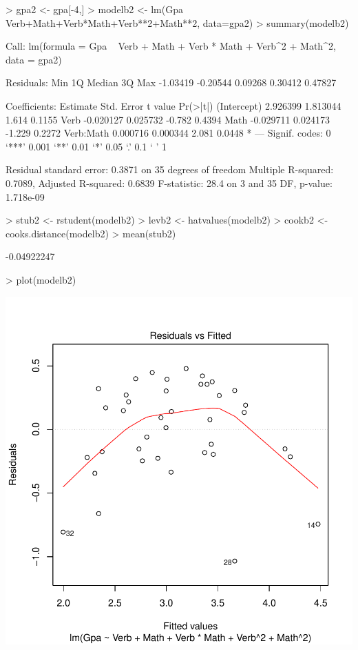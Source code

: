 \documentclass{article}
\begin{document}
\begin{Schunk}
\begin{Sinput}
> gpa2 <- gpa[-4,]
> modelb2 <- lm(Gpa ~ Verb+Math+Verb*Math+Verb**2+Math**2, data=gpa2)
> summary(modelb2)
\end{Sinput}
\begin{Soutput}
Call:
lm(formula = Gpa ~ Verb + Math + Verb * Math + Verb^2 + Math^2, 
    data = gpa2)

Residuals:
     Min       1Q   Median       3Q      Max 
-1.03419 -0.20544  0.09268  0.30412  0.47827 

Coefficients:
             Estimate Std. Error t value Pr(>|t|)  
(Intercept)  2.926399   1.813044   1.614   0.1155  
Verb        -0.020127   0.025732  -0.782   0.4394  
Math        -0.029711   0.024173  -1.229   0.2272  
Verb:Math    0.000716   0.000344   2.081   0.0448 *
---
Signif. codes:  0 ‘***’ 0.001 ‘**’ 0.01 ‘*’ 0.05 ‘.’ 0.1 ‘ ’ 1

Residual standard error: 0.3871 on 35 degrees of freedom
Multiple R-squared:  0.7089,	Adjusted R-squared:  0.6839 
F-statistic:  28.4 on 3 and 35 DF,  p-value: 1.718e-09
\end{Soutput}
\begin{Sinput}
> stub2 <- rstudent(modelb2)
> levb2 <- hatvalues(modelb2)
> cookb2 <- cooks.distance(modelb2)
> mean(stub2)
\end{Sinput}
\begin{Soutput}
[1] -0.04922247
\end{Soutput}
\end{Schunk}

\begin{Schunk}
\begin{Sinput}
> plot(modelb2)
\end{Sinput}
\end{Schunk}
\includegraphics{Assignment4a-014}
\end{document}
